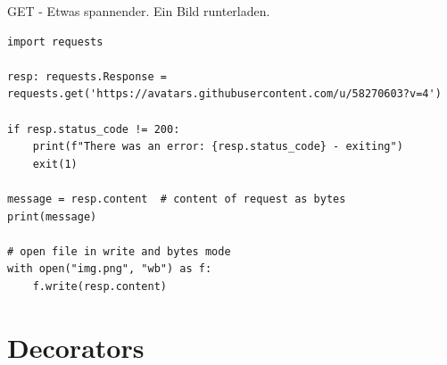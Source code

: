 \documentclass[12pt, aspectratio=169, usepdftitle=false]{beamer}
\begin{document}
\begin{frame}[fragile]{GET - Etwas spannender. Ein Bild runterladen.}
	
	\begin{lstlisting}[language=pytiny]
import requests

resp: requests.Response = requests.get('https://avatars.githubusercontent.com/u/58270603?v=4')

if resp.status_code != 200:
    print(f"There was an error: {resp.status_code} - exiting")
    exit(1)

message = resp.content  # content of request as bytes
print(message)

# open file in write and bytes mode
with open("img.png", "wb") as f:
    f.write(resp.content)
	\end{lstlisting}
\end{frame}


%	
%
%
%
%
%




\framecardfragen

\section{Decorators}
\end{document}
